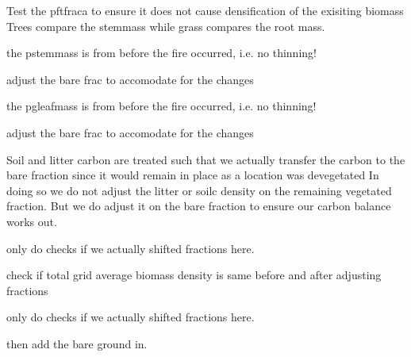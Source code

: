 Test the pftfraca to ensure it does not cause densification of the exisiting biomass Trees compare the stemmass while grass compares the root mass.

the pstemmass is from before the fire occurred, i.\+e. no thinning!

adjust the bare frac to accomodate for the changes

the pgleafmass is from before the fire occurred, i.\+e. no thinning!

adjust the bare frac to accomodate for the changes

Soil and litter carbon are treated such that we actually transfer the carbon to the bare fraction since it would remain in place as a location was devegetated In doing so we do not adjust the litter or soilc density on the remaining vegetated fraction. But we do adjust it on the bare fraction to ensure our carbon balance works out.

only do checks if we actually shifted fractions here.

check if total grid average biomass density is same before and after adjusting fractions

only do checks if we actually shifted fractions here.

then add the bare ground in. 